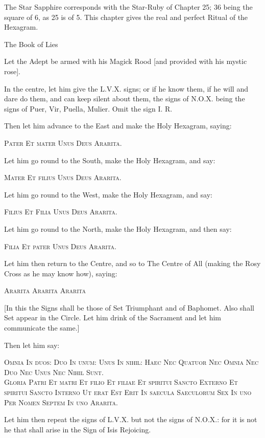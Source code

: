 
\epigraph{The Star Sapphire corresponds with the Star-Ruby of Chapter 25; 36 being the square of 6, as 25 is of 5. This chapter gives the real and perfect Ritual of the Hexagram.}{The Book of Lies}


Let the Adept be armed with his Magick Rood [and provided with his mystic rose].

In the centre, let him give the L.V.X. signs; or if he know them, if he will and dare do them, and can keep silent about them, the signs of N.O.X. being the signs of Puer, Vir, Puella, Mulier. Omit the sign I. R.

Then let him advance to the East and make the Holy Hexagram, saying:


\begin{quoting}[indentfirst=false]
\textsc{Pater Et mater Unus Deus Ararita.}
\end{quoting}

Let him go round to the South, make the Holy Hexagram, and say:

\begin{quoting}[indentfirst=false]
\textsc{Mater Et filius Unus Deus Ararita.}
\end{quoting}

Let him go round to the West, make the Holy Hexagram, and say:

\begin{quoting}[indentfirst=false]
\textsc{Filius Et Filia Unus Deus Ararita.}
\end{quoting}

Let him go round to the North, make the Holy Hexagram, and then say:

\begin{quoting}[indentfirst=false]
\textsc{Filia Et pater Unus Deus Ararita.}
\end{quoting}

Let him then return to the Centre, and so to The Centre of All (making the Rosy Cross as he may know how), saying:

\begin{quoting}[indentfirst=false]
\textsc{Ararita Ararita Ararita}
\end{quoting}

[In this the Signs shall be those of Set Triumphant and of Baphomet. Also shall Set appear in the Circle. Let him drink of the Sacrament and let him communicate the same.]

Then let him say:

\begin{quoting}
\textsc{Omnia In duos: Duo In unum: Unus In nihil: Haec Nec Quatuor Nec Omnia Nec Duo Nec Unus Nec Nihil Sunt.}\\

\textsc{Gloria Patri Et matri Et filio Et filiae Et spiritui Sancto Externo Et spiritui Sancto Interno Ut erat Est Erit In saecula Saeculorum Sex In uno Per Nomen Septem In uno Ararita.}
\end{quoting}

Let him then repeat the signs of L.V.X. but not the signs of N.O.X.: for it is not he that shall arise in the Sign of Isis Rejoicing.
